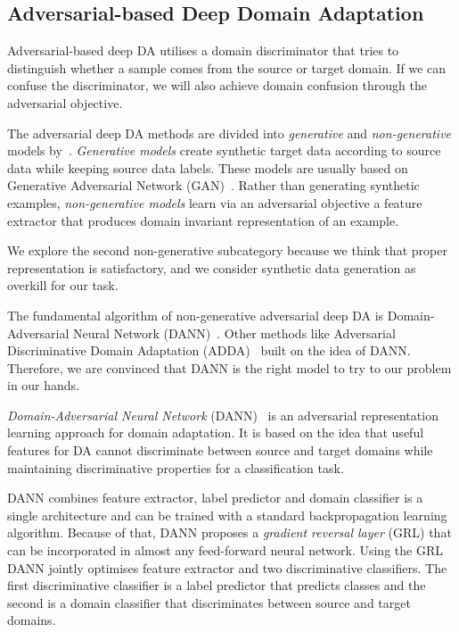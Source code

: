 \subsection{Adversarial-based Deep Domain Adaptation}
\label{adversarial_da}

Adversarial-based deep DA utilises a domain discriminator
that tries to distinguish whether a sample comes from the source or target domain.
If we can confuse the discriminator,
we will also achieve domain confusion through the adversarial objective.

The adversarial deep DA methods are divided into \textit{generative} and \textit{non-generative} models by~\cite{wang2018}.
\textit{Generative models} create synthetic target data according to source data while keeping source data labels.
These models are usually based on Generative Adversarial Network (GAN)~\cite{goodfellow2014}.
Rather than generating synthetic examples,
\textit{non-generative models} learn via an adversarial objective a feature extractor
that produces domain invariant representation of an example.

We explore the second non-generative subcategory
because we think that proper representation is satisfactory,
and we consider synthetic data generation as overkill for our task.

The fundamental algorithm of non-generative adversarial deep DA is
Domain-Adversarial Neural Network (DANN)~\cite{ganin2016}.
Other methods like Adversarial Discriminative Domain Adaptation (ADDA)~\cite{tzeng2017} built on the idea of DANN.
Therefore, we are convinced that DANN is the right model to try to our problem in our hands.

\textit{Domain-Adversarial Neural Network} (DANN)~\cite{ganin2016} is an adversarial representation learning approach for domain adaptation.
It is based on the idea that useful features for DA
cannot discriminate between source and target domains
while maintaining discriminative properties for a classification task.

DANN combines feature extractor, label predictor and domain classifier is a single architecture
and can be trained with a standard backpropagation learning algorithm.
Because of that, DANN proposes a \textit{gradient reversal layer} (GRL)
that can be incorporated in almost any feed-forward neural network.
Using the GRL DANN jointly optimises feature extractor and two discriminative classifiers.
The first discriminative classifier is a label predictor that predicts classes and the second is a domain classifier
that discriminates between source and target domains.

